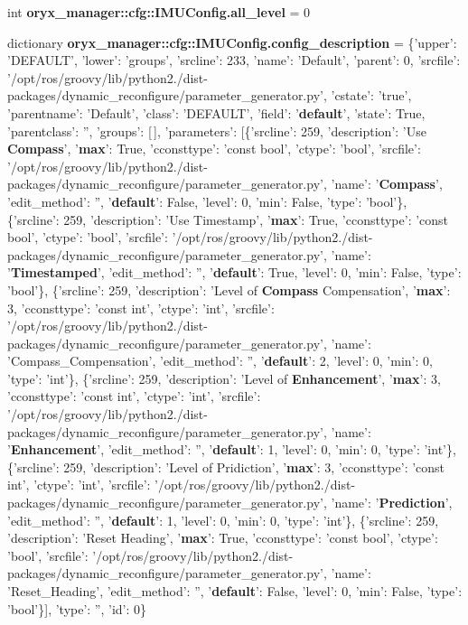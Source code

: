 \begin{DoxyCompactItemize}
\item 
int {\bf oryx\-\_\-manager\-::cfg\-::\-I\-M\-U\-Config.\-all\-\_\-level} = 0
\item 
dictionary {\bf oryx\-\_\-manager\-::cfg\-::\-I\-M\-U\-Config.\-config\-\_\-description} = \{'upper'\-: '\-D\-E\-F\-A\-U\-L\-T', 'lower'\-: 'groups', 'srcline'\-: 233, 'name'\-: '\-Default', 'parent'\-: 0, 'srcfile'\-: '/opt/ros/groovy/lib/python2./dist-\/packages/dynamic\-\_\-reconfigure/parameter\-\_\-generator.\-py', 'cstate'\-: 'true', 'parentname'\-: '\-Default', 'class'\-: '\-D\-E\-F\-A\-U\-L\-T', 'field'\-: '{\bf default}', 'state'\-: \-True, 'parentclass'\-: '', 'groups'\-: [$\,$], 'parameters'\-: [\{'srcline'\-: 259, 'description'\-: '\-Use {\bf \-Compass}', '{\bf max}'\-: \-True, 'cconsttype'\-: 'const bool', 'ctype'\-: 'bool', 'srcfile'\-: '/opt/ros/groovy/lib/python2./dist-\/packages/dynamic\-\_\-reconfigure/parameter\-\_\-generator.\-py', 'name'\-: '{\bf \-Compass}', 'edit\-\_\-method'\-: '', '{\bf default}'\-: \-False, 'level'\-: 0, 'min'\-: \-False, 'type'\-: 'bool'\}, \{'srcline'\-: 259, 'description'\-: '\-Use \-Timestamp', '{\bf max}'\-: \-True, 'cconsttype'\-: 'const bool', 'ctype'\-: 'bool', 'srcfile'\-: '/opt/ros/groovy/lib/python2./dist-\/packages/dynamic\-\_\-reconfigure/parameter\-\_\-generator.\-py', 'name'\-: '{\bf \-Timestamped}', 'edit\-\_\-method'\-: '', '{\bf default}'\-: \-True, 'level'\-: 0, 'min'\-: \-False, 'type'\-: 'bool'\}, \{'srcline'\-: 259, 'description'\-: '\-Level of {\bf \-Compass} \-Compensation', '{\bf max}'\-: 3, 'cconsttype'\-: 'const int', 'ctype'\-: 'int', 'srcfile'\-: '/opt/ros/groovy/lib/python2./dist-\/packages/dynamic\-\_\-reconfigure/parameter\-\_\-generator.\-py', 'name'\-: '\-Compass\-\_\-\-Compensation', 'edit\-\_\-method'\-: '', '{\bf default}'\-: 2, 'level'\-: 0, 'min'\-: 0, 'type'\-: 'int'\}, \{'srcline'\-: 259, 'description'\-: '\-Level of {\bf \-Enhancement}', '{\bf max}'\-: 3, 'cconsttype'\-: 'const int', 'ctype'\-: 'int', 'srcfile'\-: '/opt/ros/groovy/lib/python2./dist-\/packages/dynamic\-\_\-reconfigure/parameter\-\_\-generator.\-py', 'name'\-: '{\bf \-Enhancement}', 'edit\-\_\-method'\-: '', '{\bf default}'\-: 1, 'level'\-: 0, 'min'\-: 0, 'type'\-: 'int'\}, \{'srcline'\-: 259, 'description'\-: '\-Level of \-Pridiction', '{\bf max}'\-: 3, 'cconsttype'\-: 'const int', 'ctype'\-: 'int', 'srcfile'\-: '/opt/ros/groovy/lib/python2./dist-\/packages/dynamic\-\_\-reconfigure/parameter\-\_\-generator.\-py', 'name'\-: '{\bf \-Prediction}', 'edit\-\_\-method'\-: '', '{\bf default}'\-: 1, 'level'\-: 0, 'min'\-: 0, 'type'\-: 'int'\}, \{'srcline'\-: 259, 'description'\-: '\-Reset \-Heading', '{\bf max}'\-: \-True, 'cconsttype'\-: 'const bool', 'ctype'\-: 'bool', 'srcfile'\-: '/opt/ros/groovy/lib/python2./dist-\/packages/dynamic\-\_\-reconfigure/parameter\-\_\-generator.\-py', 'name'\-: '\-Reset\-\_\-\-Heading', 'edit\-\_\-method'\-: '', '{\bf default}'\-: \-False, 'level'\-: 0, 'min'\-: \-False, 'type'\-: 'bool'\}], 'type'\-: '', 'id'\-: 0\}

\end{DoxyCompactItemize}
